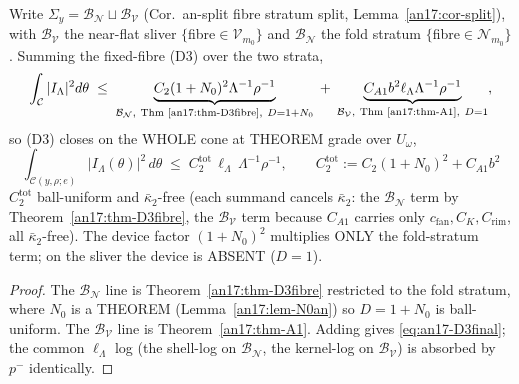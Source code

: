 \begin{corollary}\label{an17:cor-A1ledger}
Write $\Sigma_y=\mathcal B_{\mathcal N}\sqcup\mathcal B_{\mathcal V}$ (Cor.~an-split
fibre stratum split, Lemma~\ref{an17:cor-split}), with $\mathcal B_{\mathcal V}$
the near-flat sliver $\{$fibre$\in\mathcal V_{m_0}\}$ and $\mathcal B_{\mathcal N}$
the fold stratum $\{$fibre$\in\mathcal N_{m_0}\}$. Summing the fixed-fibre (D3) over
the two strata,
\begin{equation}\label{eq:an17-ledgersum}
 \int_{\mathcal C}|I_\Lambda|^2 d\theta
 \;\le\;\underbrace{C_2(1+N_0)^2\Lambda^{-1}\rho^{-1}}_{\mathcal B_{\mathcal N},\
 \text{Thm~\ref{an17:thm-D3fibre}},\ D=1+N_0}
 \;+\;\underbrace{C_{A1}b^2\ell_\Lambda\Lambda^{-1}\rho^{-1}}_{\mathcal B_{\mathcal V},\
 \text{Thm~\ref{an17:thm-A1}},\ D=1},
\end{equation}
so (D3) closes on the WHOLE cone at THEOREM grade over $U_\omega$,
\begin{equation}\label{eq:an17-D3final}
 \boxed{\ \int_{\mathcal C(y,\rho;e)}|I_\Lambda(\theta)|^2\,d\theta
 \;\le\;C_2^{\mathrm{tot}}\,\ell_\Lambda\,\Lambda^{-1}\rho^{-1},\qquad
 C_2^{\mathrm{tot}}:=C_2(1+N_0)^2+C_{A1}b^2\ }
\end{equation}
$C_2^{\mathrm{tot}}$ ball-uniform and $\bar\kappa_2$-free (each summand cancels
$\bar\kappa_2$: the $\mathcal B_{\mathcal N}$ term by
Theorem~\ref{an17:thm-D3fibre}, the $\mathcal B_{\mathcal V}$ term because $C_{A1}$
carries only $c_{\mathrm{fan}},C_K,C_{\mathrm{rim}}$, all $\bar\kappa_2$-free). The
device factor $(1+N_0)^2$ multiplies ONLY the fold-stratum term; on the sliver the
device is ABSENT ($D=1$).
\end{corollary}
\begin{proof}
The $\mathcal B_{\mathcal N}$ line is Theorem~\ref{an17:thm-D3fibre} restricted to
the fold stratum, where $N_0$ is a THEOREM (Lemma~\ref{an17:lem-N0an}) so
$D=1+N_0$ is ball-uniform. The $\mathcal B_{\mathcal V}$ line is
Theorem~\ref{an17:thm-A1}. Adding gives \eqref{eq:an17-D3final}; the common
$\ell_\Lambda$ log (the shell-log on $\mathcal B_{\mathcal N}$, the kernel-log on
$\mathcal B_{\mathcal V}$) is absorbed by $p^-$ identically.
\end{proof}

